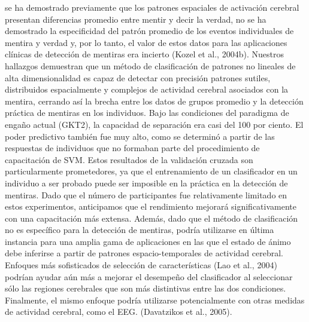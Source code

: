 se ha demostrado previamente que los patrones espaciales de activación cerebral presentan diferencias promedio entre mentir y decir la verdad, no se ha demostrado la especificidad del patrón promedio de los eventos individuales de mentira y verdad y, por lo tanto, el valor de estos datos para las aplicaciones clínicas de detección de mentiras era incierto (Kozel et al., 2004b). Nuestros hallazgos demuestran que un método de clasificación de patrones no lineales de alta dimensionalidad es capaz de detectar con precisión patrones sutiles, distribuidos espacialmente y complejos de actividad cerebral asociados con la mentira, cerrando así la brecha entre los datos de grupos promedio y la detección práctica de mentiras en los individuos. Bajo las condiciones del paradigma de engaño actual (GKT2), la capacidad de separación era casi del 100 por ciento. El poder predictivo también fue muy alto, como se determinó a partir de las respuestas de individuos que no formaban parte del procedimiento de capacitación de SVM. Estos resultados de la validación cruzada son particularmente prometedores, ya que el entrenamiento de un clasificador en un individuo a ser probado puede ser imposible en la práctica en la detección de mentiras. Dado que el número de participantes fue relativamente limitado en estos experimentos, anticipamos que el rendimiento mejorará significativamente con una capacitación más extensa. Además, dado que el método de clasificación no es específico para la detección de mentiras, podría utilizarse en última instancia para una amplia gama de aplicaciones en las que el estado de ánimo debe inferirse a partir de patrones espacio-temporales de actividad cerebral. Enfoques más sofisticados de selección de características (Lao et al., 2004) podrían ayudar aún más a mejorar el desempeño del clasificador al seleccionar sólo las regiones cerebrales que son más distintivas entre las dos condiciones. Finalmente, el mismo enfoque podría utilizarse potencialmente con otras medidas de actividad cerebral, como el EEG. (Davatzikos et al., 2005).




